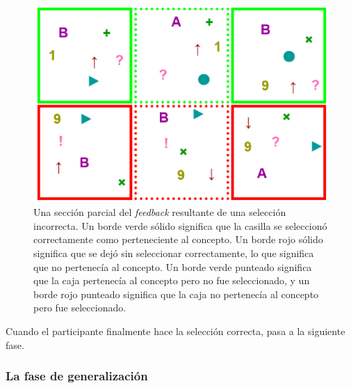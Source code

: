 \begin{figure}[h!] 
\begin{center}
    	\includegraphics[scale=0.5]{../figuras/brm/FeedBack2SeleccionParcial.PNG}
	\caption{
	Una sección parcial del {\em feedback} resultante de una selección incorrecta. Un borde verde sólido significa que la casilla se seleccionó correctamente como perteneciente al concepto. Un borde rojo sólido significa que se dejó sin seleccionar correctamente, lo que significa que no pertenecía al concepto. Un borde verde punteado significa que la caja pertenecía al concepto pero no fue seleccionado, y un borde rojo punteado significa que la caja no pertenecía al concepto pero fue seleccionado.}
	\label{Figure:Misclassifications}
\end{center}
\end{figure}

Cuando el participante finalmente hace la selección correcta, pasa a la siguiente fase.

\subsubsection{La fase de generalización}\label{Subsection:generalization}

